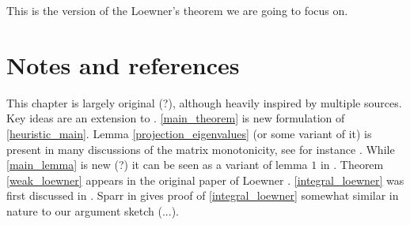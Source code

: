 This is the version of the Loewner's theorem we are going to focus on.

\section{Notes and references}

This chapter is largely original (?), although heavily inspired by multiple sources. Key ideas are an extension to \cite{Heina}. \ref{main_theorem} is new formulation of \ref{heuristic_main}. Lemma \ref{projection_eigenvalues} (or some variant of it) is present in many discussions of the matrix monotonicity, see for instance \cite{Don}. While \ref{main_lemma} is new (?) it can be seen as a variant of lemma $1$ in \cite{Sparr}. Theorem \ref{weak_loewner} appears in the original paper of Loewner \cite{Low}. \ref{integral_loewner} was first discussed in \cite{Ben}. Sparr in \cite{Sparr} gives proof of \ref{integral_loewner} somewhat similar in nature to our argument sketch (...).
